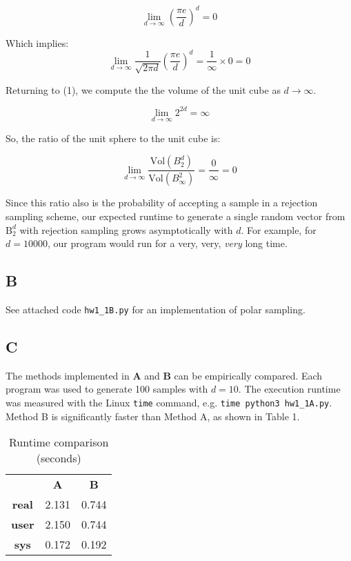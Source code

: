 \documentclass{article}
\begin{document}
\begin{equation}
\lim_{d \to \infty} \left( \frac{\pi e}{d} \right)^d = 0
\end{equation}

Which implies:
\begin{equation}
\lim_{d \to \infty} \frac{1}{\sqrt{2\pi d}} \left( \frac{\pi e}{d} \right)^d =
	\frac{1}{\infty} \times 0 = 0
\end{equation}

Returning to (1), we compute the the volume of the unit cube as $d \to \infty$.

\begin{equation}
\lim_{d \to \infty} 2^{2d} = \infty
\end{equation}

So, the ratio of the unit sphere to the unit cube is:

\begin{equation}
\lim_{d \to \infty} \frac{\mathrm{Vol}(B^d_2)}{\mathrm{Vol}(B^2_\infty)} =
\frac{0}{\infty} = 0
\end{equation}

Since this ratio also is the probability of accepting a sample in a rejection sampling
scheme, our expected runtime to generate a single random vector from $\mathrm{B}^d_2$ with
rejection sampling grows asymptotically with $d$. For example, for $d=10000$, our
program would run for a very, very, \textit{very} long time. 

\subsection*{B}
See attached code \texttt{hw1\_1B.py} for an implementation of polar sampling.

\subsection*{C}

The methods implemented in \textbf{A} and \textbf{B} can be empirically
compared. Each program was used to generate 100 samples with $d=10$. The
execution runtime was measured with the Linux \texttt{time} command, e.g.
\texttt{time python3 hw1\_1A.py}. Method B is significantly faster than Method
A, as shown in Table 1.

\begin{center}
	\begin{table}[h]
		\centering
		\caption{Runtime comparison (seconds)}
		\begin{tabular}{|c c c|}
			\hline
			& \textbf{A} & \textbf{B} \\
			\textbf{real} & 2.131 & 0.744\\
			\textbf{user} & 2.150 & 0.744\\
			\textbf{sys}  & 0.172 & 0.192\\
			\hline
		\end{tabular}
	\end{table}
\end{center}
\end{document}
